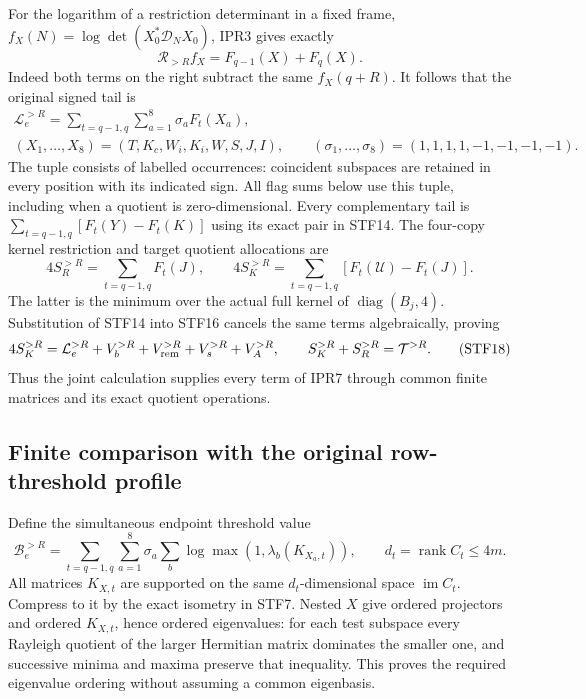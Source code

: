 \documentclass[11pt,a4paper]{article}
\begin{document}
For the logarithm of a restriction determinant in a fixed frame,
$f_X(N)=\log\det(X_0^*\mathcal D_NX_0)$, IPR3 gives exactly
\[
 \mathcal R_{>R}f_X=F_{q-1}(X)+F_q(X).                    \tag{STF15}
\]
Indeed both terms on the right subtract the same $f_X(q+R)$.
It follows that the original signed tail is
\[
\begin{gathered}
\mathcal L_e^{>R}=\sum_{t=q-1,q}\sum_{a=1}^8\sigma_a F_t(X_a),\\
(X_1,\ldots,X_8)=(T,K_c,W_i,K_i,W,S,J,I),\qquad
(\sigma_1,\ldots,\sigma_8)=(1,1,1,1,-1,-1,-1,-1).
\end{gathered}
                                                               \tag{STF16}
\]
The tuple consists of labelled occurrences: coincident subspaces are
retained in every position with its indicated sign. All flag sums below
use this tuple, including when a quotient is zero-dimensional.
Every complementary tail is $\sum_{t=q-1,q}[F_t(Y)-F_t(K)]$
using its exact pair in STF14. The four-copy kernel restriction and
target quotient allocations are
\[
 4S_R^{>R}=\sum_{t=q-1,q}F_t(J),\qquad
 4S_K^{>R}=\sum_{t=q-1,q}[F_t(\mathcal U)-F_t(J)].         \tag{STF17}
\]
The latter is the minimum over the actual full kernel of
$\operatorname{diag}(B_j,4)$. Substitution of STF14 into STF16 cancels
the same terms algebraically, proving
\[
 4S_K^{>R}=\mathcal L_e^{>R}+V_b^{>R}+V_{\rm rem}^{>R}
                        +V_s^{>R}+V_A^{>R},\qquad
 S_K^{>R}+S_R^{>R}=\mathcal T^{>R}.                       \tag{STF18}
\]
Thus the joint calculation supplies every term of IPR7 through common
finite matrices and its exact quotient operations.

\subsection{Finite comparison with the original row-threshold profile}
Define the simultaneous endpoint threshold value
\[
\mathcal B_e^{>R}=\sum_{t=q-1,q}\sum_{a=1}^8\sigma_a
             \sum_b\log\max(1,\lambda_b(K_{X_a,t})),
 \qquad d_t=\operatorname{rank}C_t\le4m.                 \tag{STF19}
\]
All matrices $K_{X,t}$ are supported on the same $d_t$-dimensional
space $\operatorname{im}C_t$. Compress to it by the exact isometry in
STF7. Nested $X$ give ordered projectors and ordered $K_{X,t}$, hence
ordered eigenvalues: for each test subspace every Rayleigh quotient of
the larger Hermitian matrix dominates the smaller one, and successive
minima and maxima preserve that inequality. This proves the required
eigenvalue ordering without assuming a common eigenbasis.
\end{document}

